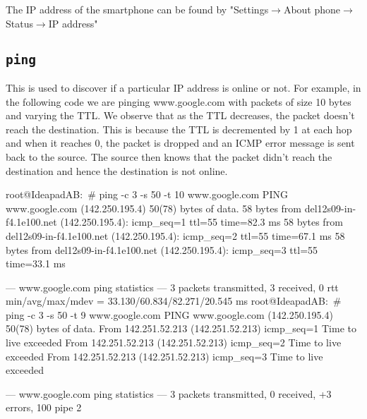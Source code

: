     The IP address of the smartphone can be found by "Settings$\rightarrow$About phone$\rightarrow$Status$\rightarrow$IP address"

\subsection{\tt ping}
This is used to discover if a particular IP address is online or not. For example, in the following code we are pinging www.google.com with packets of size 10 bytes and varying the TTL. We observe that as the TTL decreases, the packet doesn't reach the destination. This is because the TTL is decremented by 1 at each hop and when it reaches 0, the packet is dropped and an ICMP error message is sent back to the source. The source then knows that the packet didn't reach the destination and hence the destination is not online.
\begin{code}
root@IdeapadAB:~# ping -c 3 -s 50 -t 10 www.google.com
PING www.google.com (142.250.195.4) 50(78) bytes of data.
58 bytes from del12s09-in-f4.1e100.net (142.250.195.4): icmp_seq=1 ttl=55 time=82.3 ms
58 bytes from del12s09-in-f4.1e100.net (142.250.195.4): icmp_seq=2 ttl=55 time=67.1 ms
58 bytes from del12s09-in-f4.1e100.net (142.250.195.4): icmp_seq=3 ttl=55 time=33.1 ms

--- www.google.com ping statistics ---
3 packets transmitted, 3 received, 0%
rtt min/avg/max/mdev = 33.130/60.834/82.271/20.545 ms
root@IdeapadAB:~# ping -c 3 -s 50 -t 9 www.google.com
PING www.google.com (142.250.195.4) 50(78) bytes of data.
From 142.251.52.213 (142.251.52.213) icmp_seq=1 Time to live exceeded
From 142.251.52.213 (142.251.52.213) icmp_seq=2 Time to live exceeded
From 142.251.52.213 (142.251.52.213) icmp_seq=3 Time to live exceeded

--- www.google.com ping statistics ---
3 packets transmitted, 0 received, +3 errors, 100%
pipe 2
\end{code}



